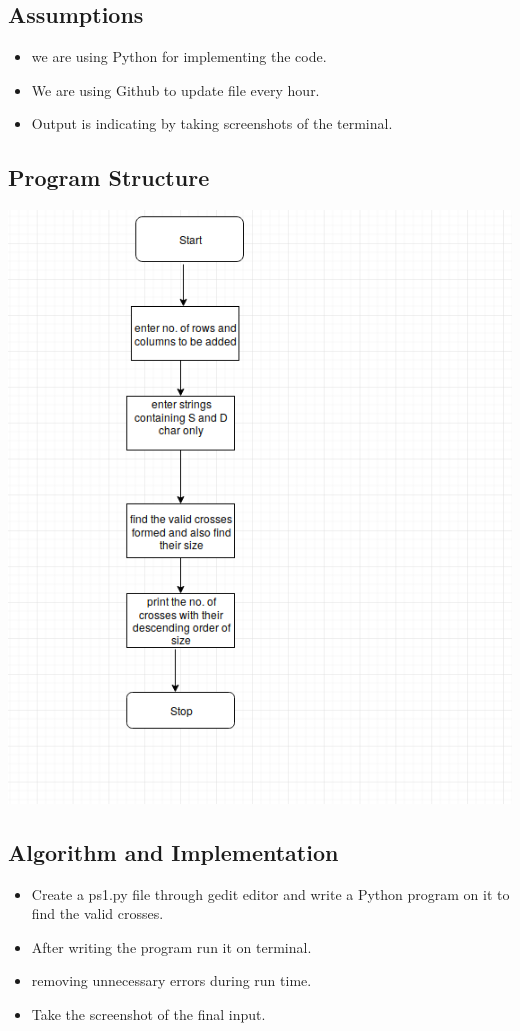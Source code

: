 \documentclass[a4paper,12pt]{article}
\begin{document}
\begin{flushleft}
\subsection{Assumptions}
\begin{itemize}
\item we are using Python for implementing the code.
\item We are using Github to update file every hour.
\item Output is indicating by taking screenshots of the terminal.
\end{itemize}
\subsection{Program Structure}
\includegraphics[scale=0.8]{flow1.png}
\subsection{Algorithm and Implementation}
\begin{itemize}
\item Create a ps1.py file through gedit editor and write a Python program on it to find the valid crosses.
\item After writing the program run it on terminal.
\item removing unnecessary errors during run time.
\item Take the screenshot of the final input. 
\end{itemize}

\end{flushleft}
\end{document}
